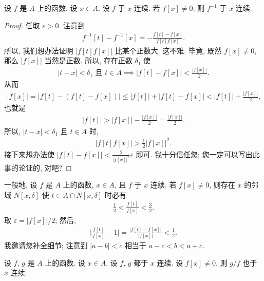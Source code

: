 \begin{theorem}
    设 $f$ 是 $A$ 上的函数. 设 $x \in A$. 设 $f$ 于 $x$ 连续. 若 $f[x] \neq 0$, 则 $f^{-1}$ 于 $x$ 连续.
\end{theorem}

\begin{proof}
    任取 $\varepsilon > 0$. 注意到
    \begin{align*}
        f^{-1} [t] - f^{-1} [x] = -\frac{f[t] - f[x]}{f[t] f[x]}.
    \end{align*}
    所以, 我们想办法证明 $|f[t] f[x]|$ 比某个正数大. 这不难. 毕竟, 既然 $f[x] \neq 0$, 那么 $|f[x]|$ 当然是正数. 所以, 存在正数 $\delta_1$ 使
    \begin{align*}
        \text{$|t - x| < \delta_1$ 且 $t \in A$} \implies |f[t] - f[x]| < \frac{|f[x]|}{2}.
    \end{align*}
    从而
    \begin{align*}
        |f[x]| = |f[t] - (f[t] - f[x])| \leq |f[t]| + |f[t] - f[x]| < |f[t]| + \frac{|f[x]|}{2},
    \end{align*}
    也就是
    \begin{align*}
        |f[t]| > |f[x]| - \frac{|f[x]|}{2} = \frac{|f[x]|}{2}.
    \end{align*}
    所以, $|t - x| < \delta_1$ 且 $t \in A$ 时,
    \begin{align*}
        |f[t] f[x]| > \frac{1}{2} |f[x]|^2.
    \end{align*}
    接下来想办法使 $|f[t] - f[x]| < \frac{2}{|f[x]|^2} \varepsilon$ 即可. 我十分信任您; 您一定可以写出此事的论证的, 对吧?
\end{proof}

\begin{remark}
    一般地, 设 $f$ 是 $A$ 上的函数, $x \in A$, 且 $f$ 于 $x$ 连续. 若 $f[x] \neq 0$, 则存在 $x$ 的邻域 $N[x, \delta]$ 使 $t \in A \cap N[x, \delta]$ 时必有
    \begin{align*}
        \frac{1}{2} < \frac{f[t]}{f[x]} < \frac{3}{2}.
    \end{align*}
    取 $\varepsilon = |f[x]|/2$; 然后,
    \begin{align*}
        \bigg| \frac{f[t]}{f[x]} - 1 \bigg| = \frac{|f[t] - f[x]|}{|f[x]|} < \frac{1}{2}.
    \end{align*}
    我邀请您补全细节; 注意到 $|a - b| < c$ 相当于 $a - c < b < a + c$.
\end{remark}

\begin{theorem}
    设 $f$, $g$ 是 $A$ 上的函数. 设 $x \in A$. 设 $f$, $g$ 都于 $x$ 连续. 设 $f[x] \neq 0$. 则 $g/f$ 也于 $x$ 连续.
\end{theorem}

